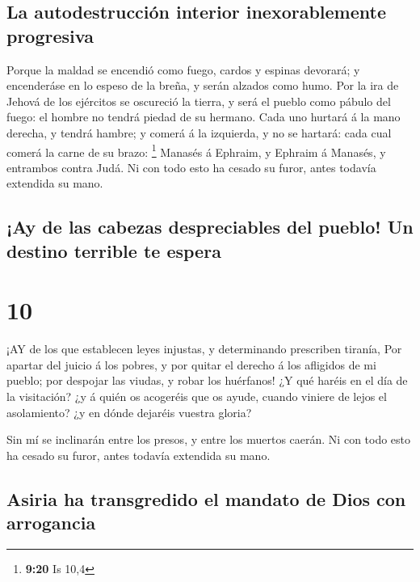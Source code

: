 \hypertarget{la-autodestrucciuxf3n-interior-inexorablemente-progresiva}{%
\subsection{La autodestrucción interior inexorablemente
progresiva}\label{la-autodestrucciuxf3n-interior-inexorablemente-progresiva}}

 Porque la maldad se encendió como fuego, cardos y espinas
devorará; y encenderáse en lo espeso de la breña, y serán alzados como
humo.  Por la ira de Jehová de los ejércitos se oscureció
la tierra, y será el pueblo como pábulo del fuego: el hombre no tendrá
piedad de su hermano.  Cada uno hurtará á la mano derecha,
y tendrá hambre; y comerá á la izquierda, y no se hartará: cada cual
comerá la carne de su brazo: \footnote{\textbf{9:20} Is 10,4}
 Manasés á Ephraim, y Ephraim á Manasés, y entrambos contra
Judá. Ni con todo esto ha cesado su furor, antes todavía extendida su
mano.

\hypertarget{ay-de-las-cabezas-despreciables-del-pueblo-un-destino-terrible-te-espera}{%
\subsection{¡Ay de las cabezas despreciables del pueblo! Un destino
terrible te
espera}\label{ay-de-las-cabezas-despreciables-del-pueblo-un-destino-terrible-te-espera}}

\hypertarget{section-9}{%
\section{10}\label{section-9}}

 ¡AY de los que establecen leyes injustas, y determinando
prescriben tiranía,  Por apartar del juicio á los pobres, y
por quitar el derecho á los afligidos de mi pueblo; por despojar las
viudas, y robar los huérfanos!  ¿Y qué haréis en el día de
la visitación? ¿y á quién os acogeréis que os ayude, cuando viniere de
lejos el asolamiento? ¿y en dónde dejaréis vuestra gloria?

 Sin mí se inclinarán entre los presos, y entre los muertos
caerán. Ni con todo esto ha cesado su furor, antes todavía extendida su
mano.

\hypertarget{asiria-ha-transgredido-el-mandato-de-dios-con-arrogancia}{%
\subsection{Asiria ha transgredido el mandato de Dios con
arrogancia}\label{asiria-ha-transgredido-el-mandato-de-dios-con-arrogancia}}


